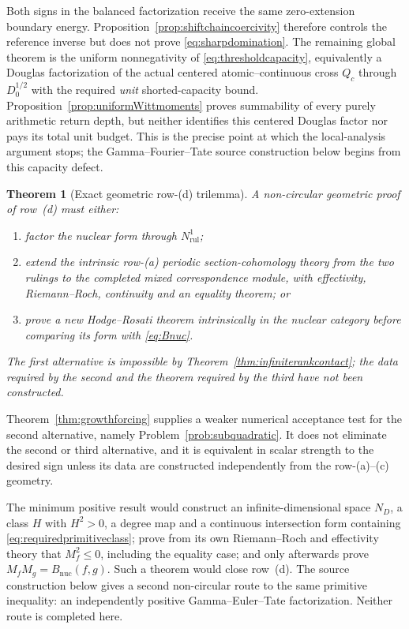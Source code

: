 \documentclass[11pt]{amsart}
\newtheorem{theorem}{Theorem}[section]
\theoremstyle{definition}
\theoremstyle{remark}
\begin{document}
Both signs in the balanced factorization receive the same zero-extension
boundary energy.  Proposition~\ref{prop:shiftchaincoercivity} therefore
controls the reference inverse but does not prove
\eqref{eq:sharpdomination}.  The remaining global theorem is the uniform
nonnegativity of \eqref{eq:thresholdcapacity}, equivalently a Douglas
factorization of the actual centered atomic--continuous cross \(Q_c\)
through \(D_0^{1/2}\) with the required \emph{unit} shorted-capacity bound.
Proposition~\ref{prop:uniformWittmoments} proves summability of every purely
arithmetic return depth, but neither identifies this centered Douglas
factor nor pays its total unit budget.  This is the precise point at which the local-analysis argument stops; the
Gamma--Fourier--Tate source construction below begins from this capacity
defect.



\begin{theorem}[Exact geometric row-(d) trilemma]
\label{thm:rowdtrilemma}
A non-circular geometric proof of row~(d) must either:
\begin{enumerate}
\item factor the nuclear form through $N^1_{\mathrm{rul}}$;
\item extend the intrinsic row-(a) periodic section-cohomology theory from the two rulings to the
completed mixed correspondence module, with effectivity, Riemann--Roch,
continuity and an equality theorem; or
\item prove a new Hodge--Rosati theorem intrinsically in the nuclear category
before comparing its form with \eqref{eq:Bnuc}.
\end{enumerate}
The first alternative is impossible by
Theorem~\ref{thm:infiniterankcontact}; the data required by the second and
the theorem required by the third have not been constructed.
\end{theorem}

Theorem~\ref{thm:growthforcing} supplies a weaker numerical acceptance test
for the second alternative, namely Problem~\ref{prob:subquadratic}.  It does
not eliminate the second or third alternative, and it is equivalent in
scalar strength to the desired sign unless its data are constructed
independently from the row-(a)--(c) geometry.

The minimum positive result would construct an infinite-dimensional space
$N_D$, a class $H$ with $H^2>0$, a degree map and a continuous intersection
form containing \eqref{eq:requiredprimitiveclass}; prove from its own
Riemann--Roch and effectivity theory that $M_f^2\le0$, including the equality
case; and only afterwards prove $M_fM_g=B_{\mathrm{nuc}}(f,g)$.  Such a theorem would close row~(d).  The source construction below gives a
second non-circular route to the same primitive inequality: an independently
positive Gamma--Euler--Tate factorization.  Neither route is completed here.
\end{document}
